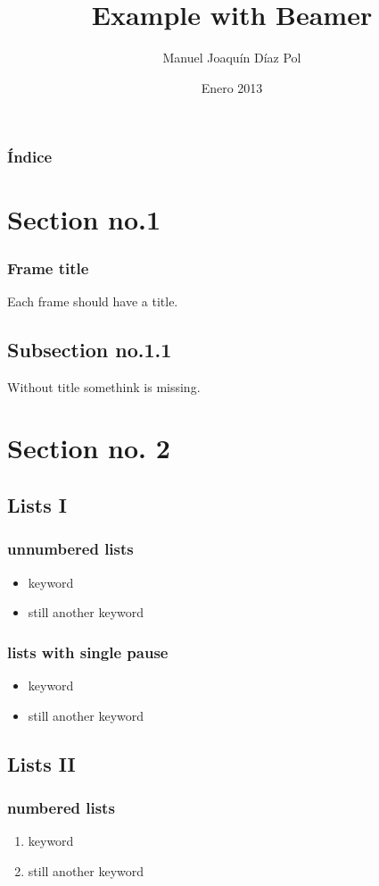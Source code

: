 \documentclass[hyperref={pdfpagelabels=false},spanish]{beamer}
\title{Example with Beamer}
\author{Manuel Joaquín Díaz Pol}
\date{Enero 2013}
\begin{document}
\begin{frame}
\titlepage
\end{frame} 

\begin{frame}
\frametitle{Índice}
\tableofcontents
\end{frame}
 


\section{Section no.1} 
\begin{frame}
\frametitle{Frame title} 
Each frame should have a title.
\end{frame}

\subsection{Subsection no.1.1  }
\begin{frame}
Without title somethink is missing. 
\end{frame}


\section{Section no. 2} 
\subsection{Lists I}
\begin{frame}
\frametitle{unnumbered lists}
\begin{itemize}
\item keyword
\item still another keyword
\end{itemize} 
\end{frame}

\begin{frame}
\frametitle{lists with single pause}
\begin{itemize}
\item keyword \pause 
\item still another keyword
\end{itemize} 
\end{frame}

\subsection{Lists II}
\begin{frame}
\frametitle{numbered lists}
\begin{enumerate}
\item keyword
\item still another keyword
\end{enumerate}
\end{frame}
\end{document}
